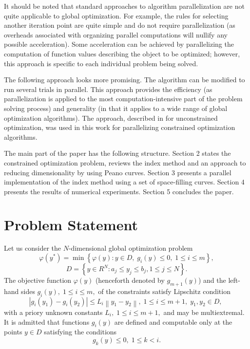 \documentclass[smallextended]{svjour3}       %
\begin{document}
It should be noted that standard approaches to algorithm parallelization are not quite applicable to global optimization. For example, the rules for selecting another iteration point are quite simple and do not require parallelization (as overheads associated with organizing parallel computations will nullify any possible acceleration). Some acceleration can be achieved by parallelizing the computation of function values describing the object to be optimized; however, this approach is specific to each individual problem being solved.

The following approach looks more promising. The algorithm can be modified to run several trials in parallel. This approach provides the efficiency (as parallelization is applied to the most computation-intensive part of the problem solving process) and generality (in that it applies to a wide range of global optimization algorithms). The approach, described in \cite{Sidorov2015} for unconstrained optimization, was used in this work for parallelizing constrained optimization algorithms.

The main part of the paper has the following structure. Section 2 states the constrained optimization problem, reviews the index method and an approach to reducing dimensionality by using Peano curves. Section 3 presents a parallel implementation of the index method using a set of space-filling curves. Section 4 presents the results of numerical experiments. Section 5 concludes the paper.


\section{Problem Statement}
\label{sec:2}

Let us consider the $N$-dimensional global optimization problem
\begin{equation}\label{problem}
\varphi(y^\ast)=\min{\left\{\varphi(y):y\in D, \; g_i(y)\leq 0, \; 1 \leq i \leq m\right\}},
\end{equation}
\begin{equation}\label{D}
D=\left\{y\in R^N: a_j\leq y_j \leq b_j, 1\leq j \leq N \right\}.
\end{equation}
The objective function $\varphi(y)$ (henceforth denoted by $g_{m+1}(y)$) and the left-hand sides $g_i(y), \; 1\leq i \leq m,$ of the constraints satisfy Lipschitz condition 
\[
\left|g_i(y_1)-g_i(y_2)\right|\leq L_i\left\|y_1-y_2\right\|, \;1\leq i\leq m+1, \; y_1,y_2 \in D,\;
\]
with a priory unknown constants $L_i, \; 1 \leq i \leq m+1,$ and may be multiextremal. It is admitted that functions $g_i(y)$ are defined and computable only at the points $y \in D$ satisfying the conditions
\begin{equation}\label{g_k}
g_k(y) \leq 0, \; 1 \leq k < i.
\end{equation}
\end{document}
